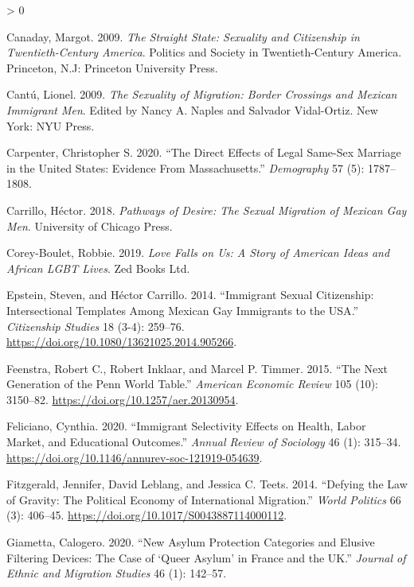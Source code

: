 \documentclass[
  11pt,
]{article}
\newlength{\cslhangindent}
\newenvironment{CSLReferences}[2] %
 {%
  \setlength{\parindent}{0pt}
  \ifodd #1 \everypar{\setlength{\hangindent}{\cslhangindent}}\ignorespaces\fi
  \ifnum #2 > 0
  \setlength{\parskip}{#2\baselineskip}
  \fi
 }%
 {}
\begin{document}
\begin{CSLReferences}{1}{0}
\leavevmode\hypertarget{ref-canaday_2009}{}%
Canaday, Margot. 2009. \emph{The Straight State: Sexuality and Citizenship in Twentieth-Century {America}}. Politics and Society in Twentieth-Century {America}. Princeton, N.J: Princeton University Press.

\leavevmode\hypertarget{ref-cantu_2009}{}%
Cantú, Lionel. 2009. \emph{The {Sexuality} of {Migration}: {Border} {Crossings} and {Mexican} {Immigrant} {Men}}. Edited by Nancy A. Naples and Salvador Vidal-Ortiz. New York: NYU Press.

\leavevmode\hypertarget{ref-carpenter_2020}{}%
Carpenter, Christopher S. 2020. {``The {Direct} {Effects} of {Legal} {Same}-{Sex} {Marriage} in the {United} {States}: {Evidence} {From} {Massachusetts}.''} \emph{Demography} 57 (5): 1787--1808.

\leavevmode\hypertarget{ref-carrillo_2018}{}%
Carrillo, Héctor. 2018. \emph{Pathways of {Desire}: {The} {Sexual} {Migration} of {Mexican} {Gay} {Men}}. University of Chicago Press.

\leavevmode\hypertarget{ref-corey-boulet_2019}{}%
Corey-Boulet, Robbie. 2019. \emph{Love {Falls} on {Us}: A Story of {American} Ideas and {African} {LGBT} Lives}. Zed Books Ltd.

\leavevmode\hypertarget{ref-epstein_2014}{}%
Epstein, Steven, and Héctor Carrillo. 2014. {``Immigrant Sexual Citizenship: Intersectional Templates Among {Mexican} Gay Immigrants to the {USA}.''} \emph{Citizenship Studies} 18 (3-4): 259--76. \url{https://doi.org/10.1080/13621025.2014.905266}.

\leavevmode\hypertarget{ref-feenstra_2015}{}%
Feenstra, Robert C., Robert Inklaar, and Marcel P. Timmer. 2015. {``The {Next} {Generation} of the {Penn} {World} {Table}.''} \emph{American Economic Review} 105 (10): 3150--82. \url{https://doi.org/10.1257/aer.20130954}.

\leavevmode\hypertarget{ref-feliciano_2020}{}%
Feliciano, Cynthia. 2020. {``Immigrant {Selectivity} {Effects} on {Health}, {Labor} {Market}, and {Educational} {Outcomes}.''} \emph{Annual Review of Sociology} 46 (1): 315--34. \url{https://doi.org/10.1146/annurev-soc-121919-054639}.

\leavevmode\hypertarget{ref-fitzgerald_2014}{}%
Fitzgerald, Jennifer, David Leblang, and Jessica C. Teets. 2014. {``Defying the {Law} of {Gravity}: {The} {Political} {Economy} of {International} {Migration}.''} \emph{World Politics} 66 (3): 406--45. \url{https://doi.org/10.1017/S0043887114000112}.

\leavevmode\hypertarget{ref-giametta_2020}{}%
Giametta, Calogero. 2020. {``New Asylum Protection Categories and Elusive Filtering Devices: The Case of {`{Queer} Asylum'} in {France} and the {UK}.''} \emph{Journal of Ethnic and Migration Studies} 46 (1): 142--57.


\end{CSLReferences}
\end{document}
